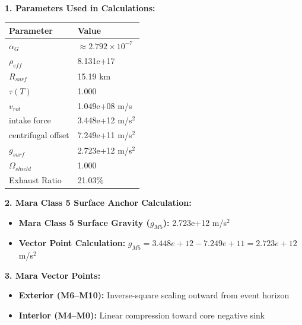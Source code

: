 \documentclass[11pt, a4paper]{article}
\begin{document}
\vspace{0.5em}
\noindent \textbf{1. Parameters Used in Calculations:}
\begin{center}
  \begin{tabular}{|l|l|}
    \hline
    \textbf{Parameter} & \textbf{Value} \\ \hline
    $\alpha_G$ & $\approx 2.792 \times 10^{-7}$ \\ \hline
    $\rho_{eff}$ & 8.131e+17 \\ \hline
    $R_{surf}$ & 15.19 km \\ \hline
    $\tau(T)$ & 1.000 \\ \hline
    $v_{rot}$ & 1.049e+08 m/s \\ \hline
    intake force & 3.448e+12 m/s$^2$ \\ \hline
    centrifugal offset & 7.249e+11 m/s$^2$ \\ \hline
    $g_{surf}$ & 2.723e+12 m/s$^2$ \\ \hline
    $\Omega_{shield}$ & 1.000 \\ \hline
    Exhaust Ratio & 21.03\% \\ \hline
  \end{tabular}
\end{center}

\vspace{0.5em}
\noindent \textbf{2. Mara Class 5 Surface Anchor Calculation:}
\begin{itemize}
  \item \textbf{Mara Class 5 Surface Gravity ($g_{M5}$):} 2.723e+12 m/s$^2$
  \item \textbf{Vector Point Calculation:} $g_{M5} = 3.448e+12 - 7.249e+11 = 2.723e+12$ m/s$^2$
\end{itemize}

\vspace{0.5em}
\noindent \textbf{3. Mara Vector Points:}
\begin{itemize}
  \item \textbf{Exterior (M6--M10):} Inverse-square scaling outward from event horizon
  \item \textbf{Interior (M4--M0):} Linear compression toward core negative sink
\end{itemize}
\end{document}
